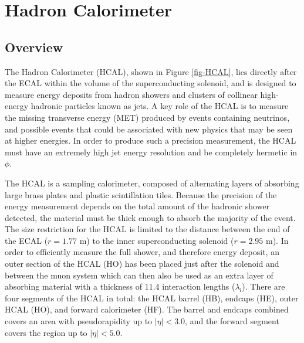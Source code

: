 \cite{CMS-DP-2013-007}

\section{Hadron Calorimeter} \label{sec-HadronCalorimeter}

\subsection{Overview}

The Hadron Calorimeter (HCAL), shown in Figure \ref{fig-HCAL}, lies directly after the ECAL within the volume of the superconducting solenoid, and is designed to measure energy deposits from hadron showers and clusters of collinear high-energy hadronic particles known as jets. A key role of the HCAL is to measure the missing transverse energy (MET) produced by events containing neutrinos, and possible events that could be associated with new physics that may be seen at higher energies. In order to produce such a precision measurement, the HCAL must have an extremely high jet energy resolution and be completely hermetic in $\phi$. 

The HCAL is a sampling calorimeter, composed of alternating layers of absorbing large brass plates and plastic scintillation tiles. Because the precision of the energy measurement depends on the total amount of the hadronic shower detected, the material must be thick enough to absorb the majority of the event. The size restriction for the HCAL is limited to the distance between the end of the ECAL ($r=1.77$ m) to the inner superconducting solenoid ($r=2.95$ m). In order to efficiently measure the full shower, and therefore energy deposit, an outer section of the HCAL (HO) has been placed just after the solenoid and between the muon system which can then also be used as an extra layer of absorbing material with a thickness of 11.4 interaction lengths ($\lambda_l$). There are four segments of the HCAL in total: the HCAL barrel (HB), endcaps (HE), outer HCAL (HO), and forward calorimeter (HF). The barrel and endcaps combined covers an area with pseudorapidity up to $|\eta|<3.0$, and the forward segment covers the region up to $|\eta|<5.0$.  

